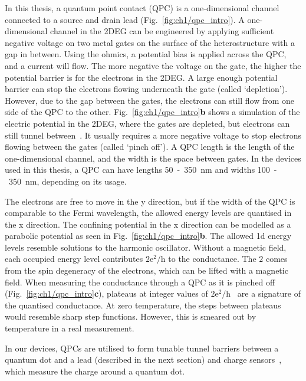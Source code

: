 In this thesis, a quantum point contact (QPC) is a one-dimensional channel connected to a source and drain lead (Fig.~\ref{fig:ch1/qpc_intro}). A one-dimensional channel in the 2DEG can be engineered by applying sufficient negative voltage on two metal gates on the surface of the heterostructure with a gap in between. Using the ohmics, a potential bias is applied across the QPC, and a current will flow. The more negative the voltage on the gate, the higher the potential barrier is for the electrons in the 2DEG. A large enough potential barrier can stop the electrons flowing underneath the gate (called `depletion'). However, due to the gap between the gates, the electrons can still flow from one side of the QPC to the other. Fig.~\ref{fig:ch1/qpc_intro}\textbf{b} shows a simulation of the electric potential in the 2DEG, where the gates are depleted, but electrons can still tunnel between~\cite{Davies1995}. It usually requires a more negative voltage to stop electrons flowing between the gates (called `pinch off'). A QPC length is the length of the one-dimensional channel, and the width is the space between gates. In the devices used in this thesis, a QPC can have lengths 50~-~\qty{350}{nm} and widths 100~-~\qty{350}{nm}, depending on its usage.

The electrons are free to move in the y direction, but if the width of the QPC is comparable to the Fermi wavelength, the allowed energy levels are quantised in the x direction. The confining potential in the x direction can be modelled as a parabolic potential as seen in Fig.~\ref{fig:ch1/qpc_intro}\textbf{b}. The allowed 1d energy levels resemble solutions to the harmonic oscillator. Without a magnetic field, each occupied energy level contributes $\mathrm{2e^2/h}$ to the conductance. The $2$ comes from the spin degeneracy of the electrons, which can be lifted with a magnetic field. When measuring the conductance through a QPC as it is pinched off (Fig.~\ref{fig:ch1/qpc_intro}\textbf{c}), plateaus at integer values of $\mathrm{2e^2/h}$~\cite{qpc_first_measurement} are a signature of the quantised conductance. At zero temperature, the steps between plateaus would resemble sharp step functions. However, this is smeared out by temperature in a real measurement.

In our devices, QPCs are utilised to form tunable tunnel barriers between a quantum dot and a lead (described in the next section) and charge sensors~\cite{cs_first_measurement}, which measure the charge around a quantum dot. 




